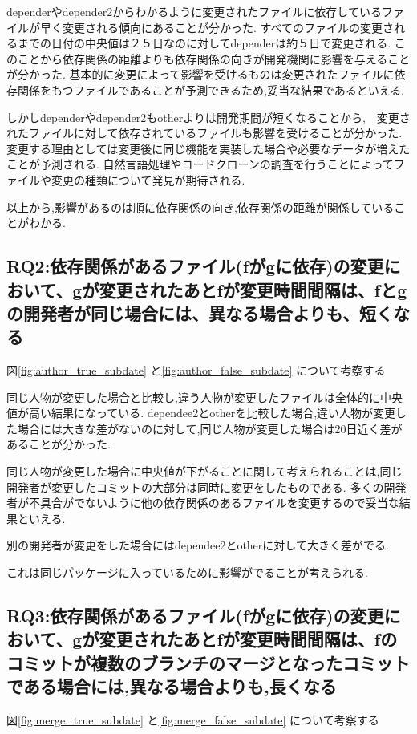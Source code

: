 \documentclass[submit,ses,noauthor]{ipsj} %
\begin{document}
dependerやdepender2からわかるように変更されたファイルに依存しているファイルが早く変更される傾向にあることが分かった.
すべてのファイルの変更されるまでの日付の中央値は２５日なのに対してdependerは約５日で変更される.
このことから依存関係の距離よりも依存関係の向きが開発機関に影響を与えることが分かった.
基本的に変更によって影響を受けるものは変更されたファイルに依存関係をもつファイルであることが予測できるため,妥当な結果であるといえる.

しかしdependerやdepender2もotherよりは開発期間が短くなることから,　変更されたファイルに対して依存されているファイルも影響を受けることが分かった.
変更する理由としては変更後に同じ機能を実装した場合や必要なデータが増えたことが予測される.
自然言語処理やコードクローンの調査を行うことによってファイルや変更の種類について発見が期待される.


以上から,影響があるのは順に依存関係の向き,依存関係の距離が関係していることがわかる.


\subsection{RQ2:依存関係があるファイル(fがgに依存)の変更において、gが変更されたあとfが変更時間間隔は、fとgの開発者が同じ場合には、異なる場合よりも、短くなる}
図\ref{fig:author_true_subdate} と\ref{fig:author_false_subdate} について考察する

同じ人物が変更した場合と比較し,違う人物が変更したファイルは全体的に中央値が高い結果になっている.
dependee2とotherを比較した場合,違い人物が変更した場合には大きな差がないのに対して,同じ人物が変更した場合は20日近く差があることが分かった.

同じ人物が変更した場合に中央値が下がることに関して考えられることは,同じ開発者が変更したコミットの大部分は同時に変更をしたものである.
多くの開発者が不具合がでないように他の依存関係のあるファイルを変更するので妥当な結果といえる.

別の開発者が変更をした場合にはdependee2とotherに対して大きく差がでる.

これは同じパッケージに入っているために影響がでることが考えられる.

\subsection{RQ3:依存関係があるファイル(fがgに依存)の変更において、gが変更されたあとfが変更時間間隔は、fのコミットが複数のブランチのマージとなったコミットである場合には,異なる場合よりも,長くなる}
図\ref{fig:merge_true_subdate} と\ref{fig:merge_false_subdate} について考察する
\end{document}
